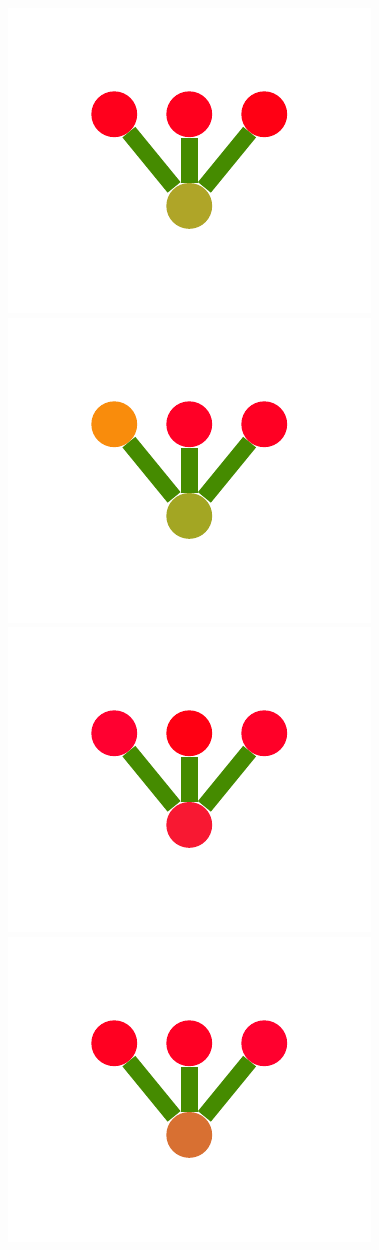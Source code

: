 \documentclass[a4paper,10pt]{article}
\begin{document}
\begin{figure}
{    \includegraphics[scale=.26]{./figures/4-2-1-noisyprog-postB-3.pdf}
    \includegraphics[scale=.26]{./figures/4-2-1-noisyprog-postB-4.pdf}
    \includegraphics[scale=.26]{./figures/4-2-1-noisyprog-postB-5.pdf}
    \includegraphics[scale=.26]{./figures/4-2-1-noisyprog-postB-6.pdf}
}
\end{figure}
\end{document}
